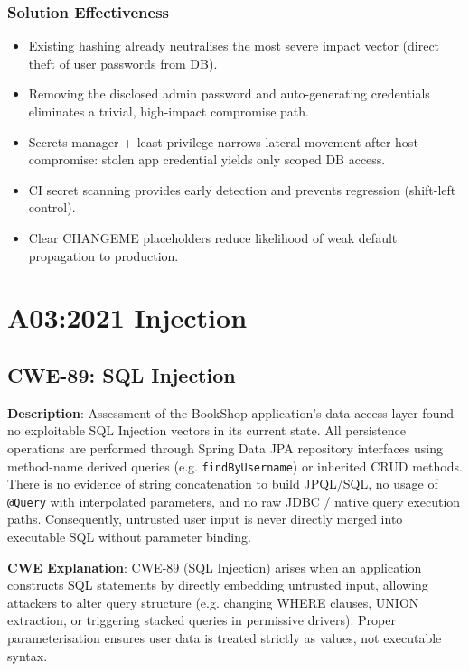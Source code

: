 \documentclass[]{UCD_CS_FYP_Report}
\begin{document}
\subsection*{Solution Effectiveness}
\begin{itemize}
	\item Existing hashing already neutralises the most severe impact vector (direct theft of user passwords from DB).
	\item Removing the disclosed admin password and auto-generating credentials eliminates a trivial, high-impact compromise path.
	\item Secrets manager + least privilege narrows lateral movement after host compromise: stolen app credential yields only scoped DB access.
	\item CI secret scanning provides early detection and prevents regression (shift-left control).
	\item Clear CHANGEME placeholders reduce likelihood of weak default propagation to production.
\end{itemize}

\chapter{A03:2021 Injection}


\section{CWE-89: SQL Injection}

	\textbf{Description}: Assessment of the BookShop application's data-access layer found no exploitable SQL Injection vectors in its current state. All persistence operations are performed through Spring Data JPA repository interfaces using method-name derived queries (e.g. \texttt{findByUsername}) or inherited CRUD methods. There is no evidence of string concatenation to build JPQL/SQL, no usage of \texttt{@Query} with interpolated parameters, and no raw JDBC / native query execution paths. Consequently, untrusted user input is never directly merged into executable SQL without parameter binding.

	\textbf{CWE Explanation}: CWE-89 (SQL Injection) arises when an application constructs SQL statements by directly embedding untrusted input, allowing attackers to alter query structure (e.g. changing WHERE clauses, UNION extraction, or triggering stacked queries in permissive drivers). Proper parameterisation ensures user data is treated strictly as values, not executable syntax.
\end{document}
